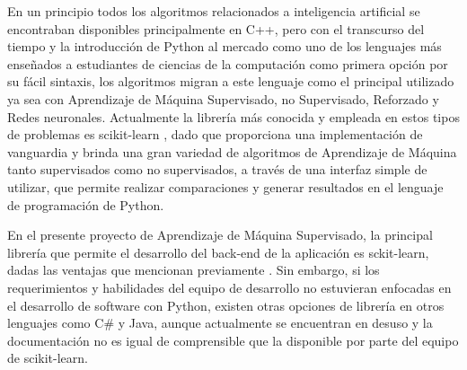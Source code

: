 En un principio todos los algoritmos relacionados a inteligencia artificial se encontraban disponibles principalmente en C++, pero con el transcurso del tiempo y la introducción de Python al mercado como uno de los lenguajes más enseñados a estudiantes de ciencias de la computación como primera opción por su fácil sintaxis, los algoritmos migran a este lenguaje como el principal utilizado ya sea con Aprendizaje de Máquina Supervisado, no Supervisado, Reforzado y Redes neuronales. Actualmente la librería más conocida y empleada en estos tipos de problemas es scikit-learn \parencite{scikit-learn}, dado que proporciona una implementación de vanguardia y brinda una gran variedad de algoritmos de Aprendizaje de Máquina tanto supervisados como no supervisados, a través de una interfaz simple de utilizar, que permite realizar comparaciones y generar resultados en el lenguaje de programación de Python.

En el presente proyecto de Aprendizaje de Máquina Supervisado, la principal librería que permite el desarrollo del back-end de la aplicación es sckit-learn, dadas las ventajas que mencionan previamente \textcite{scikit-learn}. Sin embargo, si los requerimientos y habilidades del equipo de desarrollo no estuvieran enfocadas en el desarrollo de software con Python, existen otras opciones de librería en otros lenguajes como C\# y Java, aunque actualmente se encuentran en desuso y la documentación no es igual de comprensible que la disponible por parte del equipo de scikit-learn.
